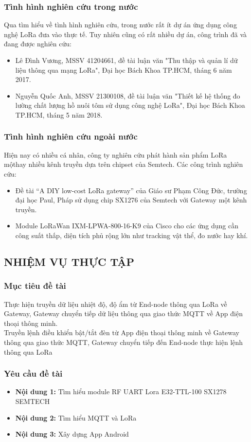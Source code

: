 \subsubsection{Tình hình nghiên cứu trong nước}
Qua tìm hiểu về tình hình nghiên cứu, trong nước rất ít dự án ứng dụng công nghệ LoRa đưa vào thực tế. Tuy nhiên cũng có rất nhiều dự án, công trình đã và đang được nghiên cứu:
\begin{itemize}
	\item Lê Đình Vương, MSSV 41204661, đề tài luận văn "Thu thập và quản lí dữ liệu thông qua mạng LoRa", Đại học Bách Khoa TP.HCM, tháng 6 năm 2017.
	\item Nguyễn Quốc Anh, MSSV 21300108, đề tài luận văn "Thiết kế hệ thống đo lường chất lượng hồ nuôi tôm sử dụng công nghệ LoRa", Đại học Bách Khoa TP.HCM, tháng 5 năm 2018.
\end{itemize}
\subsubsection{Tình hình nghiên cứu ngoài nước}
Hiện nay có nhiều cá nhân, công ty nghiên cứu phát hành sản phẩm LoRa mộthay nhiều kênh truyền dựa trên chipset của Semtech. Các công trình nghiên cứu:
\begin{itemize}
	\item Đề tài “A DIY low-cost LoRa gateway” của Giáo sư Phạm Công Đức, trường đại học Paul, Pháp sử dụng chip SX1276 của Semtech với Gateway một kênh truyền.
	\item Module LoRaWan IXM-LPWA-800-16-K9 của Cisco cho các ứng dụng cần công suất thấp, diện tích phủ rộng lớn như tracking vật thể, đo nước hay khí.
\end{itemize}
\subsection{NHIỆM VỤ THỰC TẬP}
\subsubsection{Mục tiêu đề tài}
Thực hiện truyền dữ liệu nhiệt độ, độ ẩm từ End-node thông qua LoRa về Gateway, Gateway chuyển tiếp dữ liệu thông qua giao thức MQTT về App điện thoại thông minh.\\
\indent Truyền lệnh điều khiển bật/tắt đèn từ App điện thoại thông minh về Gateway thông qua giao thức MQTT, Gateway chuyển tiếp đến End-node thực hiện lệnh thông qua LoRa
\subsubsection{Yêu cầu đề tài}
\begin{itemize}
	\item \textbf{Nội dung 1:} Tìm hiểu module RF UART Lora E32-TTL-100 SX1278 SEMTECH
	\item \textbf{Nội dung 2:} Tìm hiểu MQTT và LoRa
	\item \textbf{Nội dung 3:} Xây dựng App Android
\end{itemize}
